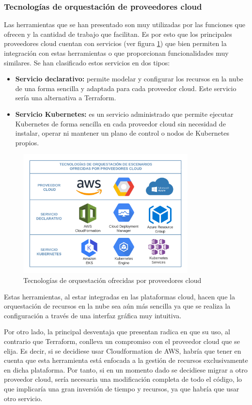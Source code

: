 \subsubsection{Tecnologías de orquestación de proveedores cloud}
	Las herramientas que se han presentado son muy utilizadas por las funciones que ofrecen y la cantidad de trabajo que facilitan. Es por esto que los principales proveedores cloud cuentan con servicios (ver figura \ref{fig:cloud}) que bien permiten la integración con estas herramientas o que proporcionan funcionalidades muy similares. Se han clasificado estos servicios en dos tipos:

	\begin{itemize}
		\item \textbf{Servicio declarativo:} permite modelar y configurar los recursos en la nube de una forma sencilla y adaptada para cada proveedor cloud. Este servicio sería una alternativa a Terraform.
		\item \textbf{Servicio Kubernetes:} es un servicio administrado que permite ejecutar Kubernetes de forma sencilla en cada proveedor cloud sin necesidad de instalar, operar ni mantener un plano de control o nodos de Kubernetes propios.
	\end{itemize}

	\begin{figure}[h]
	\centering
	\includegraphics[width=0.8\textwidth]{../imgs/cloud/Cloud-providers.png}
	\caption{Tecnologías de orquestación ofrecidas por proveedores cloud}
	\label{fig:cloud}
	\end{figure}

	Estas herramientas, al estar integradas en las plataformas cloud, hacen que la orquestación de recursos en la nube sea aún más sencilla ya que se realiza la configuración a través de una interfaz gráfica muy intuitiva.

	Por otro lado, la principal desventaja que presentan radica en que su uso, al contrario que Terraform, conlleva un compromiso con el proveedor cloud que se elija. Es decir, si se decidiese usar Cloudformation de AWS, habría que tener en cuenta que esta herramienta está enfocada a la gestión de recursos exclusivamente en dicha plataforma. Por tanto, si en un momento dado se decidiese migrar a otro proveedor cloud, sería necesaria una modificación completa de todo el código, lo que implicaría una gran inversión de tiempo y recursos, ya que habría que usar otro servicio.

